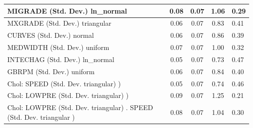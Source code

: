 \begin{table}
\begin{center}
\begin{tabular}{|l|l|c|c|c|l|}
			\hline
			MIGRADE (Std. Dev.) ln_normal &  & 0.08 & 0.07 & 1.06 & 0.29 \\
			\hline
			MXGRADE (Std. Dev.) triangular &  & 0.06 & 0.07 & 0.83 & 0.41 \\
			\hline
			CURVES (Std. Dev.) normal &  & 0.06 & 0.07 & 0.86 & 0.39 \\
			\hline
			MEDWIDTH (Std. Dev.) uniform &  & 0.07 & 0.07 & 1.00 & 0.32 \\
			\hline
			INTECHAG (Std. Dev.) ln_normal &  & 0.05 & 0.07 & 0.73 & 0.47 \\
			\hline
			GBRPM (Std. Dev.) uniform &  & 0.06 & 0.07 & 0.84 & 0.40 \\
			\hline
			 Chol: SPEED (Std. Dev. triangular) ) &  & 0.05 & 0.07 & 0.74 & 0.46 \\
			\hline
			 Chol: LOWPRE (Std. Dev. triangular) ) &  & 0.09 & 0.07 & 1.25 & 0.21 \\
			\hline
			 Chol: LOWPRE (Std. Dev. triangular) . SPEED (Std. Dev.   triangular ) &  & 0.08 & 0.07 & 1.04 & 0.30 \\
			\hline
		\end{tabular}
	\end{center}
\end{table}